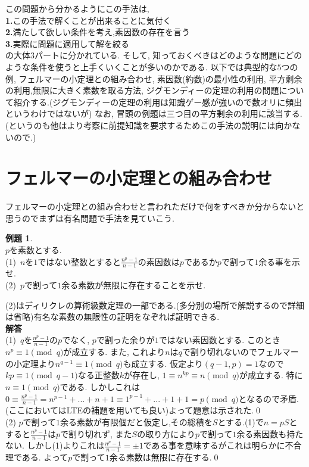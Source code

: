 \documentclass{ltjsarticle}
\theoremstyle{definition}
\newtheorem{expr}{例題}
\begin{document}
この問題から分かるようにこの手法は,\\
\textbf{1.}この手法で解くことが出来ることに気付く\\
\textbf{2.}満たして欲しい条件を考え,素因数の存在を言う\\
\textbf{3.}実際に問題に適用して解を絞る\\
の大体$3$パートに分かれている. そして, 知っておくべきはどのような問題にどのような条件を使うと上手くいくことが多いのかである. 以下では典型的な$5$つの例, フェルマーの小定理との組み合わせ, 素因数(約数)の最小性の利用, 平方剰余の利用,無限に大きく素数を取る方法, ジグモンディーの定理の利用の問題について紹介する.(ジグモンディーの定理の利用は知識ゲー感が強いので数オリに頻出というわけではないが) なお, 冒頭の例題は三つ目の平方剰余の利用に該当する. (というのも他はより考察に前提知識を要求するためこの手法の説明には向かないので.)

\section{フェルマーの小定理との組み合わせ}
フェルマーの小定理との組み合わせと言われただけで何をすべきか分からないと思うのでまずは有名問題で手法を見ていこう.

\begin{expr}\ \\
$p$を素数とする.\\
(1)\ $n$を$1$ではない整数とすると$\displaystyle\frac{n^p-1}{n-1}$の素因数は$p$であるか$p$で割って$1$余る事を示せ.\\
(2)\ $p$で割って$1$余る素数が無限に存在することを示せ.
\end{expr}

(2)はディリクレの算術級数定理の一部である.(多分別の場所で解説するので詳細は省略)有名な素数の無限性の証明をなぞれば証明できる.\\
\textbf{解答}\\
(1)\ $q$を$\displaystyle\frac{n^p-1}{n-1}$の$p$でなく, $p$で割った余りが$1$ではない素因数とする. このとき$n^p\equiv1\pmod q$が成立する. また, これより$n$は$q$で割り切れないのでフェルマーの小定理より$n^{q-1}\equiv1\pmod q$も成立する. 仮定より$(q-1,p)=1$なので$kp\equiv 1\pmod{q-1}$なる正整数$k$が存在し, $1\equiv n^{kp}\equiv n\pmod q$が成立する. 特に$n\equiv 1 \pmod q$である. しかしこれは$0\equiv\displaystyle\frac{n^p-1}{n-1}=n^{p-1}+...+n+1\equiv1^{p-1}+...+1+1=p\pmod q$となるので矛盾.(ここにおいてはLTEの補題を用いても良い)よって題意は示された.\qed\\
(2) $p$で割って$1$余る素数が有限個だと仮定し,その総積を$S$とする.(1)で$n=pS$とすると$\displaystyle\frac{n^p-1}{n-1}$は$p$で割り切れず, また$S$の取り方により$p$で割って$1$余る素因数も持たない. しかし(1)よりこれは$\displaystyle\frac{n^p-1}{n-1}=\pm1$である事を意味するがこれは明らかに不合理である. よって$p$で割って$1$余る素数は無限に存在する.\qed\\
\end{document}
